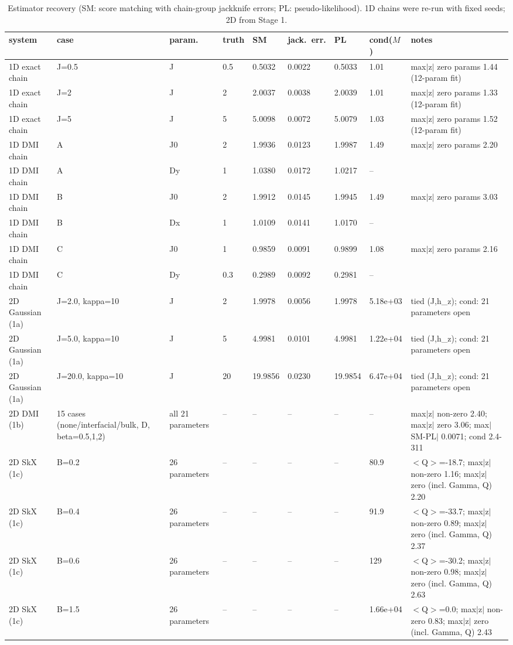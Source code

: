 \begin{table}[t]
\centering
\small
\caption{Estimator recovery (SM: score matching with chain-group jackknife errors; PL: pseudo-likelihood). 1D chains were re-run with fixed seeds; 2D from Stage 1.}
\label{tab:estimators}
\begin{tabular}{lllllllll}
\toprule
system & case & param. & truth & SM & jack.\ err. & PL & cond($M$) & notes \\
\midrule
1D exact chain & J=0.5 & J & 0.5 & 0.5032 & 0.0022 & 0.5033 & 1.01 & max$|$z$|$ zero params 1.44 (12-param fit) \\
1D exact chain & J=2 & J & 2 & 2.0037 & 0.0038 & 2.0039 & 1.01 & max$|$z$|$ zero params 1.33 (12-param fit) \\
1D exact chain & J=5 & J & 5 & 5.0098 & 0.0072 & 5.0079 & 1.03 & max$|$z$|$ zero params 1.52 (12-param fit) \\
1D DMI chain & A & J0 & 2 & 1.9936 & 0.0123 & 1.9987 & 1.49 & max$|$z$|$ zero params 2.20 \\
1D DMI chain & A & Dy & 1 & 1.0380 & 0.0172 & 1.0217 & -- &  \\
1D DMI chain & B & J0 & 2 & 1.9912 & 0.0145 & 1.9945 & 1.49 & max$|$z$|$ zero params 3.03 \\
1D DMI chain & B & Dx & 1 & 1.0109 & 0.0141 & 1.0170 & -- &  \\
1D DMI chain & C & J0 & 1 & 0.9859 & 0.0091 & 0.9899 & 1.08 & max$|$z$|$ zero params 2.16 \\
1D DMI chain & C & Dy & 0.3 & 0.2989 & 0.0092 & 0.2981 & -- &  \\
2D Gaussian (1a) & J=2.0, kappa=10 & J & 2 & 1.9978 & 0.0056 & 1.9978 & 5.18e+03 & tied (J,h\_z); cond: 21 parameters open \\
2D Gaussian (1a) & J=5.0, kappa=10 & J & 5 & 4.9981 & 0.0101 & 4.9981 & 1.22e+04 & tied (J,h\_z); cond: 21 parameters open \\
2D Gaussian (1a) & J=20.0, kappa=10 & J & 20 & 19.9856 & 0.0230 & 19.9854 & 6.47e+04 & tied (J,h\_z); cond: 21 parameters open \\
2D DMI (1b) & 15 cases (none/interfacial/bulk, D, beta=0.5,1,2) & all 21 parameters & -- & -- & -- & -- & -- & max$|$z$|$ non-zero 2.40; max$|$z$|$ zero 3.06; max$|$SM-PL$|$ 0.0071; cond 2.4-311 \\
2D SkX (1c) & B=0.2 & 26 parameters & -- & -- & -- & -- & 80.9 & $<$Q$>$=-18.7; max$|$z$|$ non-zero 1.16; max$|$z$|$ zero (incl. Gamma, Q) 2.20 \\
2D SkX (1c) & B=0.4 & 26 parameters & -- & -- & -- & -- & 91.9 & $<$Q$>$=-33.7; max$|$z$|$ non-zero 0.89; max$|$z$|$ zero (incl. Gamma, Q) 2.37 \\
2D SkX (1c) & B=0.6 & 26 parameters & -- & -- & -- & -- & 129 & $<$Q$>$=-30.2; max$|$z$|$ non-zero 0.98; max$|$z$|$ zero (incl. Gamma, Q) 2.63 \\
2D SkX (1c) & B=1.5 & 26 parameters & -- & -- & -- & -- & 1.66e+04 & $<$Q$>$=0.0; max$|$z$|$ non-zero 0.83; max$|$z$|$ zero (incl. Gamma, Q) 2.43 \\
\bottomrule
\end{tabular}
\end{table}
